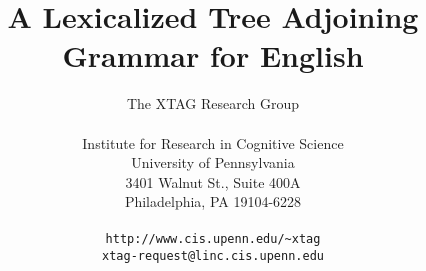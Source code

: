 \title{A  Lexicalized Tree Adjoining Grammar for English}
\author{The XTAG Research Group \\ \\
Institute for Research in Cognitive Science\\
University of Pennsylvania \\
3401 Walnut St., Suite 400A \\
Philadelphia, PA 19104-6228 \\ \\
{\tt http://www.cis.upenn.edu/\~{}xtag}\\
{\tt xtag-request@linc.cis.upenn.edu}
}
\bigskip
\makeindex
\oddsidemargin 0.25in
\evensidemargin 0.25in
\topmargin 0in
\textheight 8.5in
\textwidth 6.25in

%
%
%





\newcommand{\vertical}[1]{
\setlength{\unitlength}{0.012500in}%
\hspace*{2pt}
\begin{picture}(12,12)(0,0)
\put(0,0){\makebox(0,0)[lb]{\raisebox{0pt}[0pt][0pt]{\special{ps:gsave currentpoint currentpoint translate
-90.0 rotate neg exch neg exch translate}\rm #1\special{ps:currentpoint grestore moveto}}}}
\end{picture}
\hspace*{-18pt}
}

\newcommand{\xtagdef}[1]{{\sc #1}}
\newcommand{\xtagcheck}{$\surd$}

\setcounter{secnumdepth}{3}
\setcounter{tocdepth}{3}


